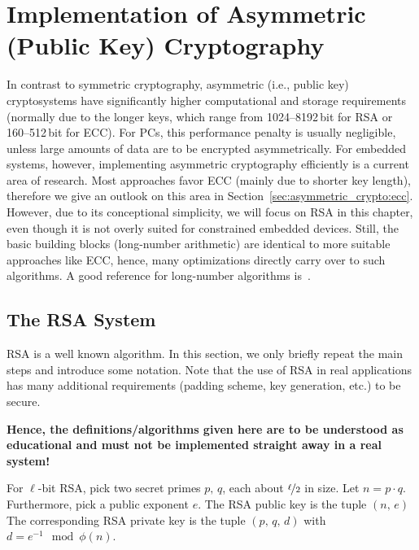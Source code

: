 
\chapter{Implementation of Asymmetric (Public Key) Cryptography}
\thispagestyle{fancy}

\label{chap:asymmetric_crypto}
In contrast to symmetric cryptography, asymmetric (i.e., public key) cryptosystems have significantly higher computational and storage requirements (normally due to the longer keys, which range from 1024--8192\,bit for \ac{RSA} or 160--512\,bit for \ac{ECC}). For \acp{PC}, this performance penalty is usually negligible, unless large amounts of data are to be encrypted asymmetrically. For embedded systems, however, implementing asymmetric cryptography efficiently is a current area of research. Most approaches favor \ac{ECC} (mainly due to shorter key length), therefore we give an outlook on this area in Section~\ref{sec:asymmetric_crypto:ecc}. However, due to its conceptional simplicity, we will focus on \ac{RSA} in this chapter, even though it is not overly suited for constrained embedded devices. Still, the basic building blocks (long-number arithmetic) are identical to more suitable approaches like \ac{ECC}, hence, many optimizations directly carry over to such algorithms. A good reference for long-number algorithms is~\cite{menezes96handbook}.

\section{The \ac{RSA} System}
\ac{RSA} is a well known algorithm. In this section, we only briefly repeat the main steps and introduce some notation. Note that the use of \ac{RSA} in real applications has many additional requirements (padding scheme, key generation, etc.) to be secure. 

\textbf{Hence, the definitions/algorithms given here are to be understood as educational and must not be implemented straight away in a real system!}

\begin{definition}
For $\ell$-bit \ac{RSA}, pick two secret primes $p,\,q$, each about $\nicefrac{\ell}{2}$ in size. Let $n = p \cdot q$. Furthermore, pick a public exponent $e$. 
The \ac{RSA} public key is the tuple  $\left(n,\,e\right)$
The corresponding \ac{RSA} private key is the tuple $\left(p,\,q,\,d\right)$ with $d = e^{-1} \mod \phi \left(n\right)$. 
\end{definition}

